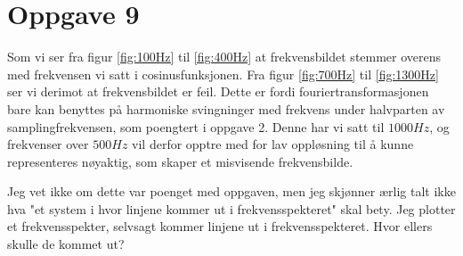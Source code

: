 \documentclass[12p,a4paper]{article}
\begin{document}
\section*{Oppgave 9}

Som vi ser fra figur \ref{fig:100Hz} til \ref{fig:400Hz} at frekvensbildet stemmer overens med frekvensen vi satt i cosinusfunksjonen. Fra figur \ref{fig:700Hz} til \ref{fig:1300Hz} ser vi derimot at frekvensbildet er feil. Dette er fordi fouriertransformasjonen bare kan benyttes på harmoniske svingninger med frekvens under halvparten av samplingfrekvensen, som poengtert i oppgave 2. Denne har vi satt til $1000Hz$, og frekvenser over $500Hz$ vil derfor opptre med for lav oppløsning til å kunne representeres nøyaktig, som skaper et misvisende frekvensbilde.

Jeg vet ikke om dette var poenget med oppgaven, men jeg skjønner ærlig talt ikke hva "et system i hvor linjene kommer ut i frekvensspekteret" skal bety. Jeg plotter et frekvensspekter, selvsagt kommer linjene ut i frekvensspekteret. Hvor ellers skulle de kommet ut? 
\end{document}

